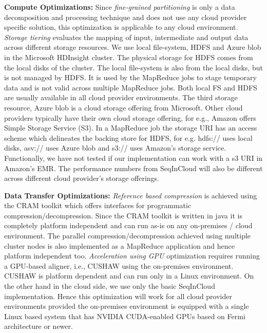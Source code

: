 \noindent\textbf{Compute Optimizations:} Since \textit{fine-grained partitioning} is only a data decomposition and processing technique and does not use any cloud provider specific solution, this optimization is applicable to any cloud environment. \textit{Storage tiering} evaluates the mapping of input, intermediate and output data across different storage resources. We use local file-system, HDFS and Azure blob in the Microsoft HDInsight cluster. The physical storage for HDFS comes from the local disks of the cluster. The local file-system is also from the local disks, but is not managed by HDFS. It is used by the MapReduce jobs to stage temporary data and is not valid across multiple MapReduce jobs. Both local FS and HDFS are usually available in all cloud provider environments. The third storage resource, Azure blob is a cloud storage offering from Microsoft. Other cloud providers typically have their own cloud storage offering, for e.g., Amazon offers Simple Storage Service (S3). In a MapReduce job the storage URI has an access scheme which delineates the backing store for HDFS, for e.g. hdfs:// uses local disks, asv:// uses Azure blob and s3:// uses Amazon's storage service. Functionally, we have not tested if our implementation can work with a s3 URI in Amazon's EMR. The performance numbers from SeqInCloud will also be different across different cloud provider's storage offerings.

\noindent\textbf{Data Transfer Optimizations:} \textit{Reference based compression} is achieved using the CRAM toolkit which offers interfaces for programmatic compression/decompression. Since the CRAM toolkit is written in java it is completely platform independent and can run as-is on any on-premises / cloud environment. The parallel compression/decompression achieved using multiple cluster nodes is also implemented as a MapReduce application and hence platform independent too. \textit{Acceleration using GPU} optimization requires running a GPU-based aligner, i.e., CUSHAW using the on-premises environment. CUSHAW is platform dependent and can run only in a Linux environment. On the other hand in the cloud side, we use only the basic SeqInCloud implementation. Hence this optimization will work for all cloud provider environments provided the on-premises environment is equipped with a single Linux based system that has NVIDIA CUDA-enabled GPUs based on Fermi architecture or newer.